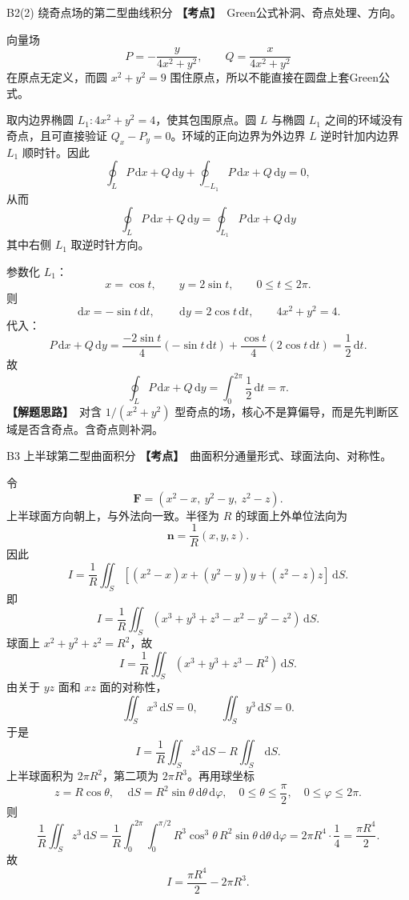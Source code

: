 \documentclass[UTF8,zihao=-4,openany]{ctexbook}
\newcommand{\dd}{\,\mathrm{d}}
\newcommand{\thinking}{\textcolor{mainblue}{\bfseries【解题思路】}}
\newcommand{\point}{\textcolor{warnred}{\bfseries【考点】}}
\begin{document}
\begin{solutionbox}{B2(2) 绕奇点场的第二型曲线积分}
\point\ Green公式补洞、奇点处理、方向。

向量场
\[
P=-\frac{y}{4x^2+y^2},
\qquad
Q=\frac{x}{4x^2+y^2}
\]
在原点无定义，而圆 $x^2+y^2=9$ 围住原点，所以不能直接在圆盘上套Green公式。

取内边界椭圆 $L_1:4x^2+y^2=4$，使其包围原点。圆 $L$ 与椭圆 $L_1$ 之间的环域没有奇点，且可直接验证 $Q_x-P_y=0$。环域的正向边界为外边界 $L$ 逆时针加内边界 $L_1$ 顺时针。因此
\[
\oint_LP\dd x+Q\dd y+\oint_{-L_1}P\dd x+Q\dd y=0,
\]
从而
\[
\oint_LP\dd x+Q\dd y=\oint_{L_1}P\dd x+Q\dd y
\]
其中右侧 $L_1$ 取逆时针方向。

参数化 $L_1$：
\[
x=\cos t,
\qquad
y=2\sin t,
\qquad
0\le t\le2\pi.
\]
则
\[
\dd x=-\sin t\dd t,
\qquad
\dd y=2\cos t\dd t,
\qquad
4x^2+y^2=4.
\]
代入：
\[
P\dd x+Q\dd y=\frac{-2\sin t}{4}(-\sin t\dd t)+\frac{\cos t}{4}(2\cos t\dd t)
=\frac12\dd t.
\]
故
\[
\boxed{\oint_LP\dd x+Q\dd y=\int_0^{2\pi}\frac12\dd t=\pi.}
\]
\thinking\ 对含 $1/(x^2+y^2)$ 型奇点的场，核心不是算偏导，而是先判断区域是否含奇点。含奇点则补洞。
\end{solutionbox}

\begin{solutionbox}{B3 上半球第二型曲面积分}
\point\ 曲面积分通量形式、球面法向、对称性。

令
\[
\bm F=(x^2-x,\ y^2-y,\ z^2-z).
\]
上半球面方向朝上，与外法向一致。半径为 $R$ 的球面上外单位法向为
\[
\bm n=\frac{1}{R}(x,y,z).
\]
因此
\[
I=\frac1R\iint_S[(x^2-x)x+(y^2-y)y+(z^2-z)z]\dd S.
\]
即
\[
I=\frac1R\iint_S(x^3+y^3+z^3-x^2-y^2-z^2)\dd S.
\]
球面上 $x^2+y^2+z^2=R^2$，故
\[
I=\frac1R\iint_S(x^3+y^3+z^3-R^2)\dd S.
\]
由关于 $yz$ 面和 $xz$ 面的对称性，
\[
\iint_Sx^3\dd S=0,
\qquad
\iint_Sy^3\dd S=0.
\]
于是
\[
I=\frac1R\iint_S z^3\dd S-R\iint_S\dd S.
\]
上半球面积为 $2\pi R^2$，第二项为 $2\pi R^3$。再用球坐标
\[
z=R\cos\theta,
\quad
\dd S=R^2\sin\theta\dd\theta\dd\varphi,
\quad
0\le\theta\le\frac\pi2,
\quad
0\le\varphi\le2\pi.
\]
则
\[
\frac1R\iint_Sz^3\dd S
=\frac1R\int_0^{2\pi}\int_0^{\pi/2}R^3\cos^3\theta\,R^2\sin\theta\dd\theta\dd\varphi
=2\pi R^4\cdot\frac14=\frac{\pi R^4}{2}.
\]
故
\[
\boxed{I=\frac{\pi R^4}{2}-2\pi R^3.}
\]
\end{solutionbox}
\end{document}
